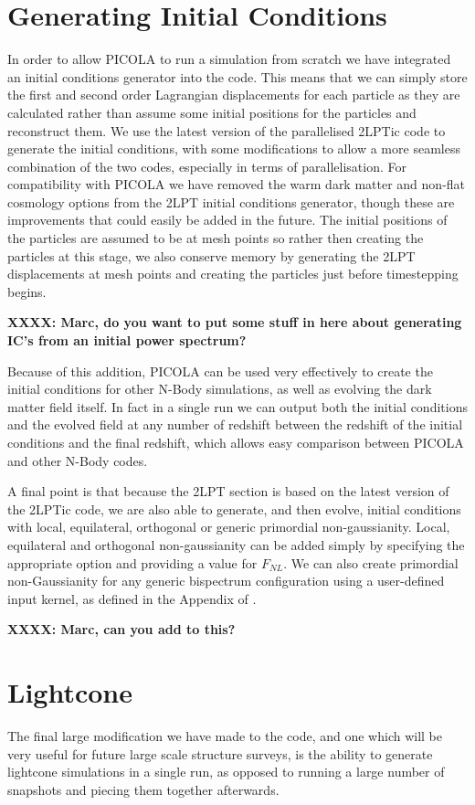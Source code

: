 \documentclass[5p,authoryear]{elsarticle}
\begin{document}
\section{Generating Initial Conditions}
In order to allow PICOLA to run a simulation from scratch we have integrated an initial conditions generator into the code. This means that we can simply store the first and second order Lagrangian displacements for each particle as they are calculated rather than assume some initial positions for the particles and reconstruct them. We use the latest version of the parallelised 2LPTic code \cite{Scoccimarro2010} to generate the initial conditions, with some modifications to allow a more seamless combination of the two codes, especially in terms of  parallelisation. For compatibility with PICOLA we have removed the warm dark matter and non-flat cosmology options from the 2LPT initial conditions generator, though these are improvements that could easily be added in the future. The initial positions of the particles are assumed to be at mesh points so rather then creating the particles at this stage, we also conserve memory by generating the 2LPT displacements at mesh points and creating the particles just before timestepping begins.

\textbf{XXXX: Marc, do you want to put some stuff in here about generating IC's from an initial power spectrum?}

Because of this addition, PICOLA can be used very effectively to create the initial conditions for other N-Body simulations, as well as evolving the dark matter field itself. In fact in a single run we can output both the initial conditions and the evolved field at any number of redshift between the redshift of the initial conditions and the final redshift, which allows easy comparison between PICOLA and other N-Body codes.

A final point is that because the 2LPT section is based on the latest version of the 2LPTic code, we are also able to generate, and then evolve, initial conditions with local, equilateral, orthogonal or generic primordial non-gaussianity. Local, equilateral and orthogonal non-gaussianity can be added simply by specifying the appropriate option and providing a value for $F_{NL}$. We can also create primordial non-Gaussianity for any generic bispectrum configuration using a user-defined input kernel, as defined in the Appendix of \cite{Scoccimarro2012}.

\textbf{XXXX: Marc, can you add to this?}

\section{Lightcone}
The final large modification we have made to the code, and one which will be very useful for future large scale structure surveys, is the ability to generate lightcone simulations in a single run, as opposed to running a large number of snapshots and piecing them together afterwards.
\end{document}
